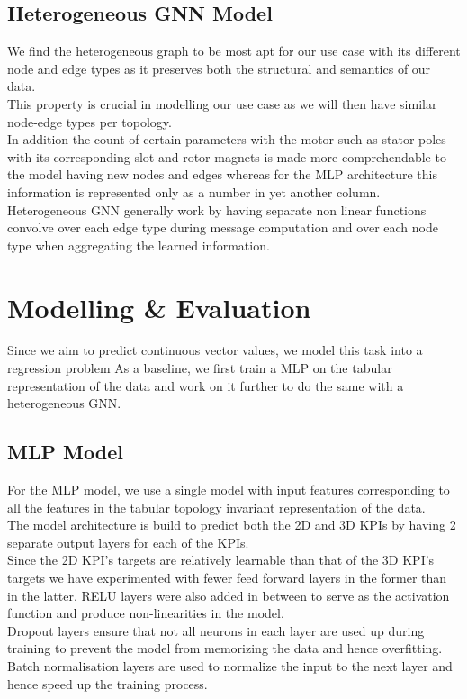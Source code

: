 \documentclass{report} %
\begin{document}
\section{Heterogeneous \ac{GNN} Model}\label{sec:Heterogeneous GNN Model}

We find the heterogeneous graph to be most apt for our use case with its different node and edge types as it preserves both the structural and semantics of our data. \\
This property is crucial in modelling our use case as we will then have similar node-edge types per topology. \\
In addition the count of certain parameters with the motor such as stator poles with its corresponding slot and rotor magnets is made more comprehendable to the model having new nodes and edges whereas for the \ac{MLP} architecture this information is represented only as a number in yet another column. \\
Heterogeneous \ac{GNN} generally work by having separate non linear functions convolve over each edge type during message computation and over each node type when aggregating the learned information. \\
 
\newpage 
\chapter{Modelling \& Evaluation}

Since we aim to predict continuous vector values, we model this task into a regression problem
As a baseline, we first train a \ac{MLP} on the tabular representation of the data and work on it further to do the same with a heterogeneous \ac{GNN}.

\section{\ac{MLP} Model}\label{sec:MLP Model}

For the \ac{MLP} model, we use a single model with input features corresponding to all the features in the tabular topology invariant representation of the data.\\
The model architecture is build to predict both the \ac{2D} and \ac{3D} \ac{KPI}s by having 2 separate output layers for each of the \ac{KPI}s. \\
Since the \ac{2D} \ac{KPI}'s targets are relatively learnable than that of the \ac{3D} \ac{KPI}'s targets we have experimented with fewer feed forward layers in the former than in the latter.
RELU layers were also added in between to serve as the activation function and produce non-linearities in the model. \\
Dropout layers ensure that not all neurons in each layer are used up during training to prevent the model from memorizing the data and hence overfitting.
Batch normalisation layers are used to normalize the input to the next layer and hence speed up the training process.\\
\end{document}
